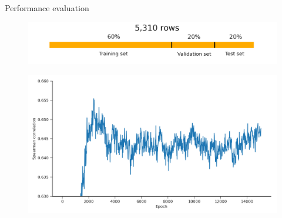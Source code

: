 \documentclass[Nike]{tuberlinbeamer}
\begin{document}
\begin{frame}{Performance evaluation}
  \begin{figure}
    \includegraphics[width=0.60\linewidth]{./datasetpartition.png}
  \end{figure}
  \pause
  \begin{figure}
    \includegraphics[width=0.75\linewidth]{./validation_training_curve.png}
  \end{figure}

\end{frame}
\end{document}
